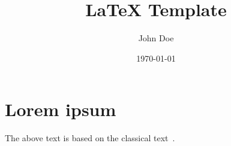 \documentclass{article}
\title{LaTeX Template}
\author{John Doe}
\date{\today}
\begin{document}
\maketitle

\begin{abstract}
    \lipsum
\end{abstract}

\section{Lorem ipsum}
\lipsum

The above text is based on the classical text~\cite{lipsum}.



\end{document}
